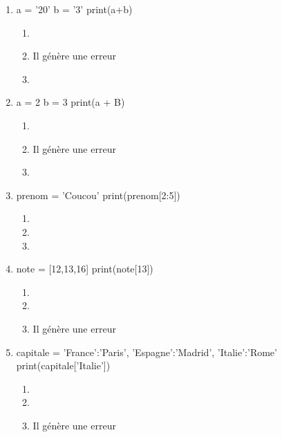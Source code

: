 \documentclass[a4paper,10pt]{article}
\begin{document}
\begin{multicols}{2}
\begin{enumerate}[\bfseries 1.]
\item 
\begin{python}
a = '20'
b = '3'
print(a+b)
\end{python}
\begin{enumerate}[\case\ \ a.]
\item 	{}
\item 	Il génère une erreur
\item 	{}
\end{enumerate}	

\item 
\begin{python}
a = 2
b = 3
print(a + B)
\end{python}
\begin{enumerate}[\case\ \ a.]
\item 	{}
\item 	Il génère une erreur
\item 	{}
\end{enumerate}	

\item 
\begin{python}
prenom = 'Coucou'
print(prenom[2:5])
\end{python}
\begin{enumerate}[\case\ \ a.]
\item 	{}
\item 	{}
\item 	{}
\end{enumerate}	

\item 
\begin{python}
note = [12,13,16]
print(note[13])
\end{python}
\begin{enumerate}[\case\ \ a.]
\item 	{}
\item 	{}
\item 	Il génère une erreur
\end{enumerate}

\item 
\begin{python}
capitale = {'France':'Paris', 'Espagne':'Madrid', 'Italie':'Rome'}
print(capitale['Italie'])
\end{python}
\begin{enumerate}[\case\ \ a.]
\item 	{}
\item 	{}
\item 	Il génère une erreur
\end{enumerate}

\end{enumerate}	
\end{multicols}
\end{document}
